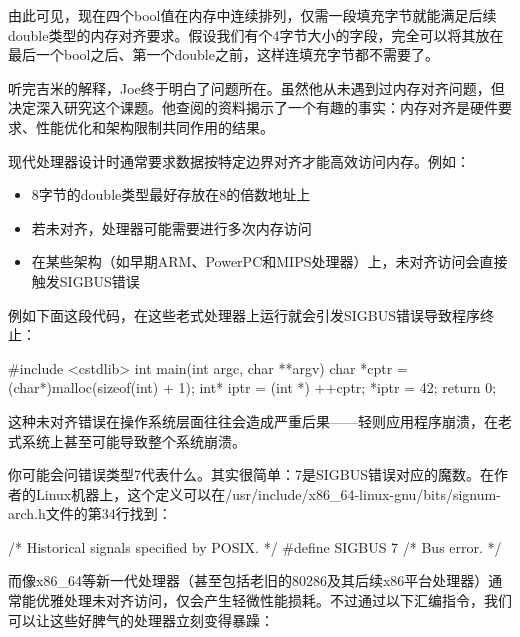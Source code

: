 由此可见，现在四个bool值在内存中连续排列，仅需一段填充字节就能满足后续double类型的内存对齐要求。假设我们有个4字节大小的字段，完全可以将其放在最后一个bool之后、第一个double之前，这样连填充字节都不需要了。

听完吉米的解释，Joe终于明白了问题所在。虽然他从未遇到过内存对齐问题，但决定深入研究这个课题。他查阅的资料揭示了一个有趣的事实：内存对齐是硬件要求、性能优化和架构限制共同作用的结果。

现代处理器设计时通常要求数据按特定边界对齐才能高效访问内存。例如：

\begin{itemize}
\item 
8字节的double类型最好存放在8的倍数地址上

\item 
若未对齐，处理器可能需要进行多次内存访问

\item 
在某些架构（如早期ARM、PowerPC和MIPS处理器）上，未对齐访问会直接触发SIGBUS错误
\end{itemize}

例如下面这段代码，在这些老式处理器上运行就会引发SIGBUS错误导致程序终止：

\begin{cpp}
#include <cstdlib>
  int main(int argc, char **argv) {
  char *cptr = (char*)malloc(sizeof(int) + 1);
  int* iptr = (int *) ++cptr;
  *iptr = 42;
  return 0;
}
\end{cpp}

这种未对齐错误在操作系统层面往往会造成严重后果——轻则应用程序崩溃，在老式系统上甚至可能导致整个系统崩溃。


你可能会问错误类型7代表什么。其实很简单：7是SIGBUS错误对应的魔数。在作者的Linux机器上，这个定义可以在/usr/include/x86\_64-linux-gnu/bits/signum-arch.h文件的第34行找到：

\begin{cpp}
/* Historical signals specified by POSIX. */
#define SIGBUS         7    /* Bus error. */
\end{cpp}

而像x86\_64等新一代处理器（甚至包括老旧的80286及其后续x86平台处理器）通常能优雅处理未对齐访问，仅会产生轻微性能损耗。不过通过以下汇编指令，我们可以让这些好脾气的处理器立刻变得暴躁：

